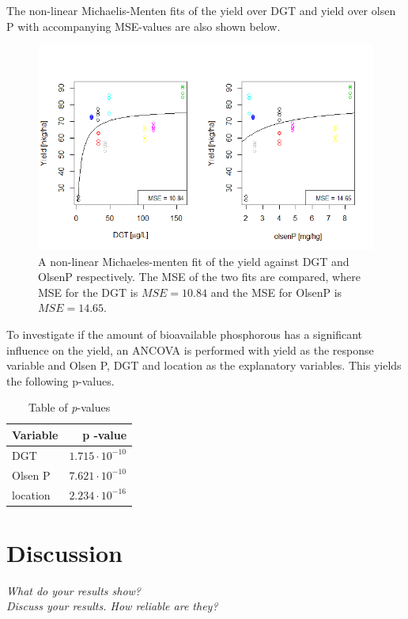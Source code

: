 \documentclass[11pt, fleqn, titlepage]{article}
\begin{document}
\noindent The non-linear Michaelis-Menten fits of the yield over DGT and yield over olsen P with accompanying MSE-values are also shown below.

\begin{figure}[H]
	\centering
	\includegraphics[width=0.7\linewidth]{billeder/non-linearfit.png}
	\caption{A non-linear Michaeles-menten fit of the yield against DGT and OlsenP respectively. The MSE of the two fits are compared, where MSE for the DGT is $ MSE = 10.84 $ and the MSE for OlsenP is $ MSE = 14.65 $.}
	\label{fig:non-linearfit}
\end{figure}

\noindent To investigate if the amount of bioavailable phosphorous has a significant influence on the yield, an ANCOVA is performed with yield as the response variable and Olsen P, DGT and location as the explanatory variables. This yields the following p-values.

\begin{table}[H]
	\centering
	\begin{tabular}{l r}
		\toprule
		Variable     & p -value                       \\ \midrule
		DGT          & $1.715 \cdot 10^{-10}$       \\ 
		Olsen P      & $7.621 \cdot 10^{-10}$         \\ 
		location     & $2.234 \cdot 10^{-16}$       \\ \bottomrule 
	\end{tabular}
	\caption{Table of \textit{p}-values}
	\label{tabel}
\end{table}

\section{Discussion}
\textit{What do your results show? \\ Discuss your results. How reliable are they?}
\end{document}
